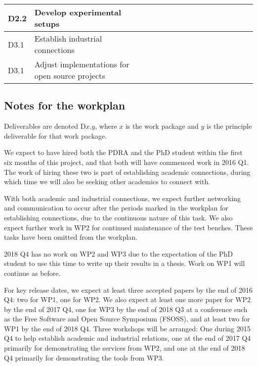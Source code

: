 \documentclass[a4paper,11pt]{article}
\begin{document}
\begin{landscape}
\begin{tabularx}{\linewidth}{|lX|c|c|c|c|c|c|c|c|c|c|c|c|c|c|c|}
        D2.2 & Develop experimental setups & & & & & \cellcolor[gray]{0.5} & \cellcolor[gray]{0.5} & \cellcolor[gray]{0.5} & \cellcolor[gray]{0.5} & \cellcolor[gray]{0.5} & \cellcolor[gray]{0.5} & & & & \\\hline
        D3.1 & Establish industrial connections & \cellcolor[gray]{0.5} & \cellcolor[gray]{0.5} & & & & & \cellcolor[gray]{0.5} & \cellcolor[gray]{0.5} & \cellcolor[gray]{0.5} & & & & & \\\hline
        D3.1 & Adjust implementations for open source projects & & & & & & & & & \cellcolor[gray]{0.5} & \cellcolor[gray]{0.5} & \cellcolor[gray]{0.5} & \cellcolor[gray]{0.5} & \cellcolor[gray]{0.5} & \\\hline
    \end{tabularx}

    \subsection*{Notes for the workplan}

    Deliverables are denoted D$x.y$, where $x$ is the work package and $y$ is the principle deliverable for that work package.

    We expect to have hired both the PDRA and the PhD student within the first six months of this project, and that both will have commenced work in 2016 Q1. The work of hiring these two is part of establishing academic connections, during which time we will also be seeking other academics to connect with.

    With both academic and industrial connections, we expect further networking and communication to occur after the periods marked in the workplan for establishing connections, due to the continuous nature of this task. We also expect further work in WP2 for continued maintenance of the test benches. These tasks have been omitted from the workplan.

    2018 Q4 has no work on WP2 and WP3 due to the expectation of the PhD student to use this time to write up their results in a thesis. Work on WP1 will continue as before.

    For key release dates, we expect at least three accepted papers by the end of 2016 Q4: two for WP1, one for WP2. We also expect at least one more paper for WP2 by the end of 2017 Q4, one for WP3 by the end of 2018 Q3 at a conference such as the Free Software and Open Source Symposium (FSOSS), and at least two for WP1 by the end of 2018 Q4. Three workshops will be arranged: One during 2015 Q4 to help establish academic and industrial relations, one at the end of 2017 Q4 primarily for demonstrating the services from WP2, and one at the end of 2018 Q4 primarily for demonstrating the tools from WP3.

    \end{landscape}
\end{document}
